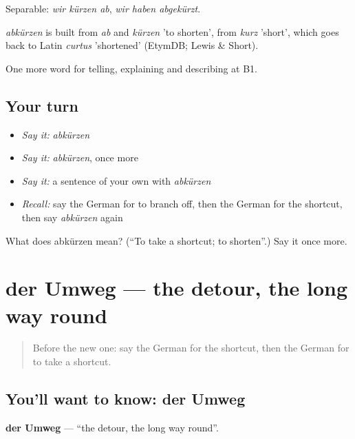 Separable: \emph{wir kürzen ab}, \emph{wir haben abgekürzt}.

\begin{cousinweb}
\emph{abkürzen} is built from \emph{ab} and \emph{kürzen} 'to shorten', from \emph{kurz} 'short', which goes back to Latin \emph{curtus} 'shortened' (EtymDB; Lewis \& Short).
\end{cousinweb}

\begin{grammarlens}[title={What you've built}]
One more word for telling, explaining and describing at B1.
\end{grammarlens}

\subsection*{Your turn}
\begin{itemize}
\raggedright
  \item \emph{Say it:} \emph{abkürzen}
  \item \emph{Say it:} \emph{abkürzen}, once more
  \item \emph{Say it:} a sentence of your own with \emph{abkürzen}
  \item \emph{Recall:} say the German for to branch off, then the German for the shortcut, then say \emph{abkürzen} again
\end{itemize}

\begin{tcolorbox}[breakable,colback=teal!4,colframe=teal!35!black,title={Before you move on}]
What does abkürzen mean? (\textquotedblleft{}To take a shortcut; to shorten\textquotedblright{}.) Say it once more.
\end{tcolorbox}
\section[der Umweg]{der Umweg — the detour, the long way round}

\label{lesson:GE-C435-umweg}



\begin{quote}
Before the new one: say the German for the shortcut, then the German for to take a shortcut.
\end{quote}

\subsection*{You'll want to know: der Umweg}
\textbf{der Umweg} — \textquotedblleft{}the detour, the long way round\textquotedblright{}.


